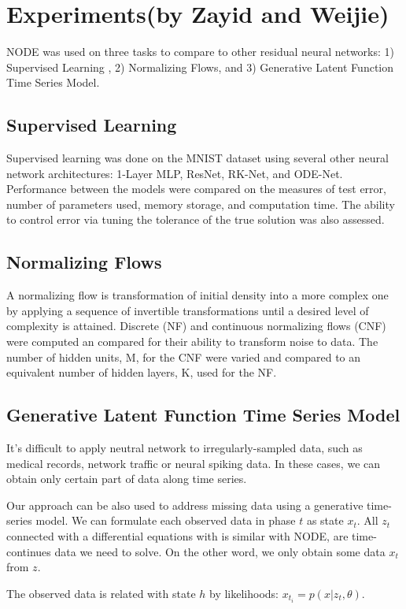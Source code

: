 \documentclass{article}
\begin{document}
\section{Experiments(by Zayid and Weijie)}
\label{sec:experiment}
NODE was used on three tasks to compare to other residual neural networks:
1) Supervised Learning , 2) Normalizing Flows, and 3) Generative Latent Function Time Series Model.
\subsection{Supervised Learning}
Supervised learning was done on the MNIST dataset using several other neural network architectures:  1-Layer MLP, ResNet, RK-Net, and ODE-Net. Performance between the models were compared on the measures of test error, number of parameters used, memory storage, and computation time. The ability to control error via tuning the tolerance of the true solution was also assessed.

\subsection{Normalizing Flows}
A normalizing flow is transformation of initial density into a more complex one by applying a sequence of invertible transformations until a desired level of complexity is attained. Discrete (NF) and continuous normalizing flows (CNF) were computed an compared for their ability to transform noise to data. The number of hidden units, M, for the CNF were varied and compared to an equivalent number of hidden layers, K, used for the NF.

\subsection{Generative Latent Function Time Series Model}
It's difficult to apply neutral network to irregularly-sampled data, such as medical records, network traffic or neural spiking data. In these cases, we can obtain only certain part of data along time series.

Our approach can be also used to address missing data using a generative time-series model. We can formulate each observed data in phase $t$ as state $x_t$. All $z_t$ connected with a differential equations with is similar with NODE, are time-continues data we need to solve. On the other word, we only obtain some data $x_t$ from $z$.

The observed data is related with state $h$ by likelihoods: $x_{t_i} = p(x | z_t, \theta)$.
\end{document}
